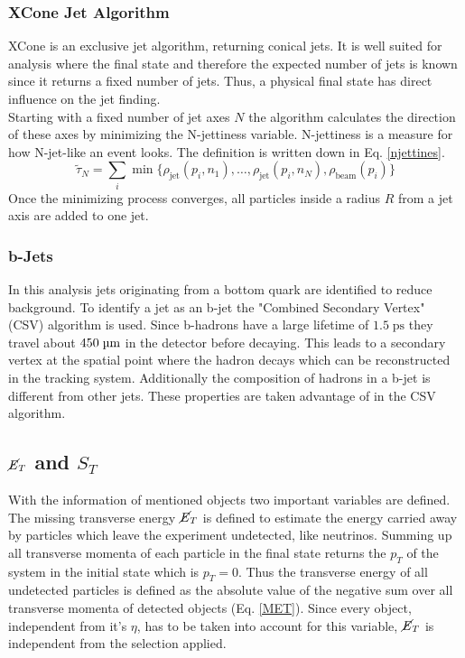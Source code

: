 \subsubsection{XCone Jet Algorithm}
	XCone \cite{xcone} is an exclusive jet algorithm, returning conical jets. It is well suited for analysis where the final state and therefore the expected number of jets is known since it returns a fixed number of jets. Thus, a physical final state has direct influence on the jet finding. \\
	Starting with a fixed number of jet axes $N$ the algorithm calculates the direction of these axes by minimizing the N-jettiness variable. N-jettiness is a measure for how N-jet-like an event looks. The definition is written down in Eq. \ref{njettines}.
	\begin{equation}
	\tilde{\tau}_N = \sum_i \min\{\rho_\text{jet}(p_i, n_1), \dots, \rho_\text{jet}(p_i, n_N), \rho_\text{beam}(p_i)\}
	\label{njettines}
	\end{equation}
	Once the minimizing process converges, all particles inside a radius $R$ from a jet axis are added to one jet.

\subsubsection{b-Jets}
	In this analysis jets originating from a bottom quark are identified to reduce background. To identify a jet as an b-jet the "Combined Secondary Vertex" (CSV) algorithm is used. Since b-hadrons have a large lifetime of $1.5\;\text{ps}$ they travel about $450\;\text{\textmu m}$ in the detector before decaying. This leads to a secondary vertex at the spatial point where the hadron decays which can be reconstructed in the tracking system. Additionally the composition of hadrons in a b-jet is different from other jets.
	These properties are taken advantage of in the CSV algorithm. 
	
\subsection{$\cancel{E}_T$ and $S_T$}
	With the information of mentioned objects two important variables are defined. The missing transverse energy $\cancel{E}_T$ is defined to estimate the energy carried away by particles which leave the experiment undetected, like neutrinos. Summing up all transverse momenta of each particle in the final state returns the $p_T$ of the system in the initial state which is $p_T = 0$. Thus the transverse energy of all undetected particles is defined as the absolute value of the negative sum over all transverse momenta of detected objects (Eq. \ref{MET}). Since every object, independent from it's $\eta$, has to be taken into account for this variable, $\cancel{E}_T$ is independent from the selection applied.
	
